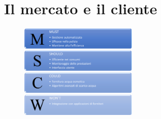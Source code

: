 \documentclass[a4paper, 12pt]{article}
\begin{document}
	\section{Il mercato e il cliente}
	\begin{figure}[h]
		\includegraphics[width=0.5\textwidth]{Images/MoSCoW.png}
	\end{figure}
\end{document}
